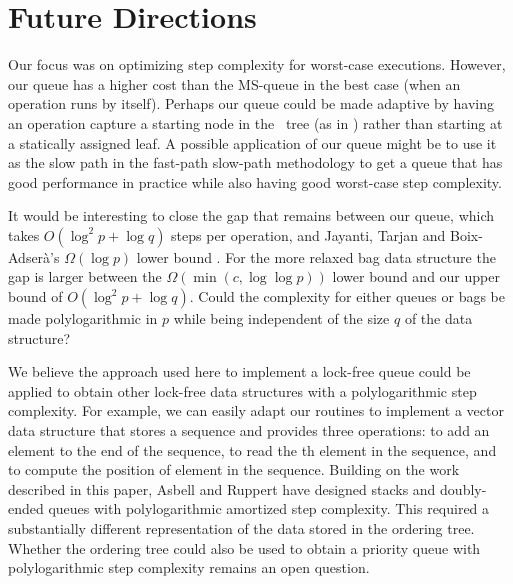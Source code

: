
\section{Future Directions}

Our focus was on optimizing step complexity for worst-case executions.
However, our queue has a higher cost than the MS-queue in the best case (when an operation
runs by itself).
Perhaps our queue could be made adaptive by having an operation capture a starting node
in the \ordering\ tree (as in \cite{DBLP:conf/stoc/AfekDT95}) rather than starting at a statically assigned leaf.
A possible application of our queue  might be to use it as the slow path in the
fast-path slow-path methodology  \cite{10.1145/2370036.2145835} to
get a queue that has good performance in practice while also having good worst-case step complexity.

It would be interesting to close the gap that remains between our queue, which takes $O(\log^2 p + \log q)$ steps per operation,
and Jayanti, Tarjan and Boix-Adser\`{a}'s $\Omega(\log p)$ lower bound \cite{JTB19}.
For the more relaxed bag data structure the gap is larger between the  $\Omega(\min(c,\log\log p))$ lower bound \cite{DBLP:conf/opodis/AttiyaF17} and our upper bound of $O(\log^2 p + \log q)$.
Could the complexity for either queues or bags be made polylogarithmic in $p$ while being independent of the size $q$ of the data structure?

We believe the approach used here to implement a lock-free queue 
could be applied to obtain other lock-free
data structures with a polylogarithmic step complexity.
For example, we can easily adapt our routines to implement a  vector data structure that stores a sequence and
provides three operations:  to add an element  to the end of the sequence,
 to read the th element in the sequence, and
 to compute the position of element  in the sequence.
Building on the work described in this paper, Asbell and Ruppert \cite{AR23} have
designed stacks and doubly-ended queues with polylogarithmic amortized step
complexity.  This required a substantially different representation of the data stored in the ordering tree.
Whether the ordering tree could also be used to obtain a priority queue with polylogarithmic step complexity
remains an open question.

